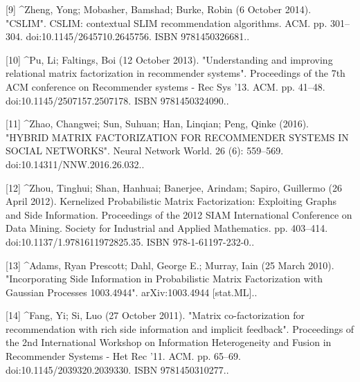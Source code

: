 [9]
^Zheng, Yong; Mobasher, Bamshad; Burke, Robin (6 October 2014). "CSLIM". CSLIM: contextual SLIM recommendation algorithms. ACM. pp. 301–304. doi:10.1145/2645710.2645756. ISBN 9781450326681..

[10]
^Pu, Li; Faltings, Boi (12 October 2013). "Understanding and improving relational matrix factorization in recommender systems". Proceedings of the 7th ACM conference on Recommender systems - Rec Sys '13. ACM. pp. 41–48. doi:10.1145/2507157.2507178. ISBN 9781450324090..

[11]
^Zhao, Changwei; Sun, Suhuan; Han, Linqian; Peng, Qinke (2016). "HYBRID MATRIX FACTORIZATION FOR RECOMMENDER SYSTEMS IN SOCIAL NETWORKS". Neural Network World. 26 (6): 559–569. doi:10.14311/NNW.2016.26.032..

[12]
^Zhou, Tinghui; Shan, Hanhuai; Banerjee, Arindam; Sapiro, Guillermo (26 April 2012). Kernelized Probabilistic Matrix Factorization: Exploiting Graphs and Side Information. Proceedings of the 2012 SIAM International Conference on Data Mining. Society for Industrial and Applied Mathematics. pp. 403–414. doi:10.1137/1.9781611972825.35. ISBN 978-1-61197-232-0..

[13]
^Adams, Ryan Prescott; Dahl, George E.; Murray, Iain (25 March 2010). "Incorporating Side Information in Probabilistic Matrix Factorization with Gaussian Processes 1003.4944". arXiv:1003.4944 [stat.ML]..

[14]
^Fang, Yi; Si, Luo (27 October 2011). "Matrix co-factorization for recommendation with rich side information and implicit feedback". Proceedings of the 2nd International Workshop on Information Heterogeneity and Fusion in Recommender Systems - Het Rec '11. ACM. pp. 65–69. doi:10.1145/2039320.2039330. ISBN 9781450310277..